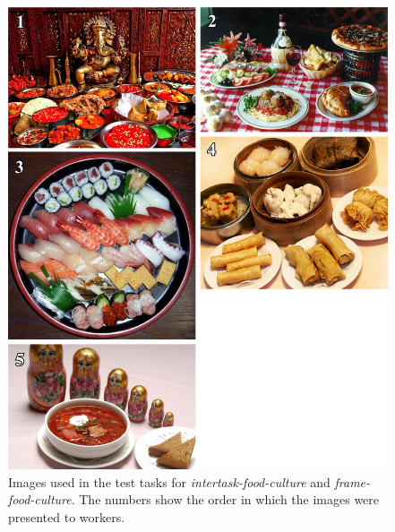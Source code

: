 \documentclass{sigchi}
\begin{document}
\begin{figure}
	\begin{center}
	\includegraphics{figs/task2-test.jpg}
	\end{center}
	\caption{
		Images used in the test tasks for \textit{intertask-food-culture} 
		and \textit{frame-food-culture}.  
		The numbers show the order in which the 
		images were presented to workers.
	}
	\label{fig:task2:test}
\end{figure}
\end{document}
